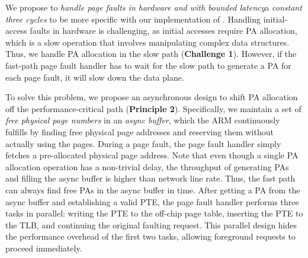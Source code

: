 We propose to {\em handle page faults in hardware and with bounded latency}\textemdash a {\em constant three cycles} to be more specific with our implementation of \sysboard.
Handling initial-access faults in hardware is challenging, as initial accesses require PA allocation, which is a slow operation that involves manipulating complex data structures.
Thus, we handle PA allocation in the slow path (\textbf{Challenge 1}).
However, if the fast-path page fault handler has to wait for the slow path to generate a PA for each page fault,
it will slow down the data plane.

To solve this problem, we propose an asynchronous design to shift PA allocation off the performance-critical path (\textbf{Principle 2}).
Specifically, we maintain a set of {\em free physical page numbers} in an {\em async buffer},
which the ARM continuously fulfills by finding free physical page addresses and reserving them without actually using the pages. %
During a page fault, the page fault handler simply fetches a pre-allocated physical page address. %
Note that even though a single PA allocation operation has a non-trivial delay, 
the throughput of generating PAs and filling the async buffer is higher than network line rate.
Thus, the fast path can always find free PAs in the async buffer in time.
After getting a PA from the async buffer and establishing a valid PTE, %
the page fault handler performs three tasks in parallel: 
writing the PTE to the off-chip page table, inserting the PTE to the TLB,
and continuing the original faulting request.
This parallel design hides the performance overhead of the first two tasks, allowing foreground requests to proceed immediately.

